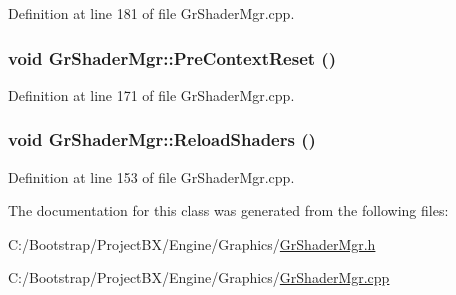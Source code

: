 Definition at line 181 of file GrShaderMgr.cpp.\hypertarget{class_gr_shader_mgr_a7e5765aee3b61abbae8be39ffea63ad}{
\subsubsection[{PreContextReset}]{\setlength{\rightskip}{0pt plus 5cm}void GrShaderMgr::PreContextReset ()}}
\label{class_gr_shader_mgr_a7e5765aee3b61abbae8be39ffea63ad}




Definition at line 171 of file GrShaderMgr.cpp.\hypertarget{class_gr_shader_mgr_ff45e5ef3d72acfa36df2a286c27a954}{
\subsubsection[{ReloadShaders}]{\setlength{\rightskip}{0pt plus 5cm}void GrShaderMgr::ReloadShaders ()}}
\label{class_gr_shader_mgr_ff45e5ef3d72acfa36df2a286c27a954}




Definition at line 153 of file GrShaderMgr.cpp.

The documentation for this class was generated from the following files:\begin{CompactItemize}
\item 
C:/Bootstrap/ProjectBX/Engine/Graphics/\hyperlink{_gr_shader_mgr_8h}{GrShaderMgr.h}\item 
C:/Bootstrap/ProjectBX/Engine/Graphics/\hyperlink{_gr_shader_mgr_8cpp}{GrShaderMgr.cpp}\end{CompactItemize}
